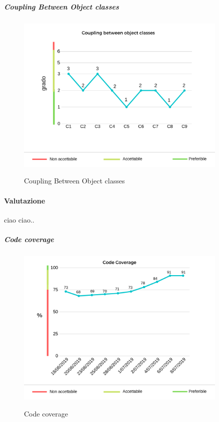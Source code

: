 	\pagebreak
	\subparagraph{Coupling Between Object classes}
	\begin{center}
		\begin{figure}[h] 
			\centering 
			\includegraphics[width=0.90\textwidth]{res/images/new/cbo.png}\\
			\caption{Coupling Between Object classes}
		\end{figure}
	\end{center}
	\paragraph*{Valutazione} ciao ciao..
	\pagebreak
	\subparagraph{Code coverage}
	\begin{center}
		\begin{figure}[h] 
			\centering 
			\includegraphics[width=0.90\textwidth]{res/images/new/codecov.png}\\
			\caption{Code coverage}
		\end{figure}
	\end{center}
